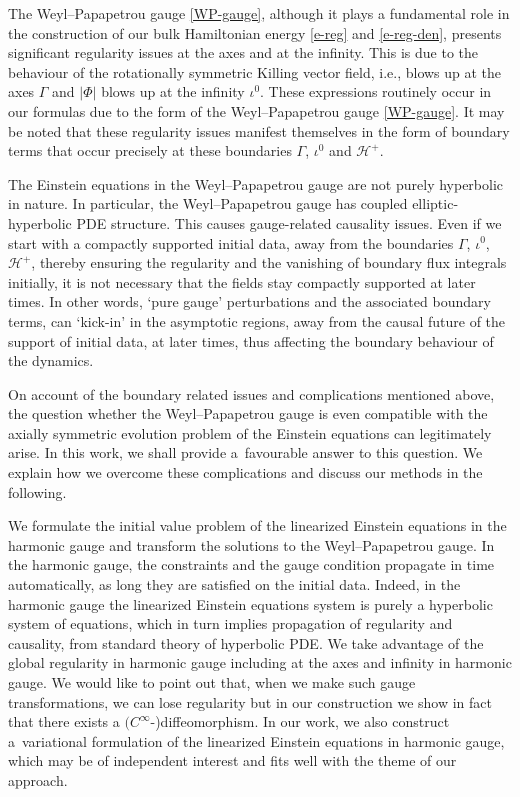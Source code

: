 \documentclass[pdftex]{sigma}
\numberwithin{equation}{section}
\begin{document}
The Weyl--Papapetrou gauge \eqref{WP-gauge}, although it plays a fundamental role in the construction of our bulk Hamiltonian energy \eqref{e-reg} and \eqref{e-reg-den}, presents significant regularity issues at the axes and at the infinity. This is due to the behaviour of the rotationally symmetric Killing vector field, i.e.,  blows up at the axes $\Gamma$ and $\vert \Phi \vert$ blows up at the infinity $\iota^0$. These expressions routinely occur in our formulas due to the form of the Weyl--Papapetrou gauge \eqref{WP-gauge}. It may be noted that these regularity issues manifest themselves in the form of boundary terms that occur precisely at these boundaries $\Gamma$, $\iota^0$ and $\mathcal{H}^+$.

The Einstein equations in the Weyl--Papapetrou gauge are not purely hyperbolic in nature. In particular, the Weyl--Papapetrou gauge has coupled elliptic-hyperbolic PDE structure. This causes gauge-related causality issues. Even if we start with a compactly supported initial data, away from the boundaries $\Gamma$, $\iota^0$, $\mathcal{H}^+$, thereby ensuring the regularity and the vanishing of boundary flux integrals initially, it is not necessary that the fields stay compactly supported at later times. In other words, `pure gauge' perturbations and the associated boundary terms, can `kick-in' in the asymptotic regions, away from the causal future of the support of initial data, at later times, thus affecting the boundary behaviour of the dynamics.



On account of the boundary related issues and complications mentioned above, the question whether the Weyl--Papapetrou gauge is even compatible with the axially symmetric evolution problem of the Einstein equations can legitimately arise. In this work, we shall provide a~favourable answer to this question. We explain how we overcome these complications and discuss our methods in the following.

We formulate the initial value problem of the linearized Einstein equations in the harmonic gauge and transform the solutions to the Weyl--Papapetrou gauge. In the harmonic gauge, the constraints and the gauge condition propagate in time automatically, as long they are satisfied on the initial data. Indeed, in the harmonic gauge the linearized Einstein equations system is purely a hyperbolic system of equations, which in turn implies propagation of regularity and causality, from standard theory of hyperbolic PDE. We take advantage of the global regularity in harmonic gauge including at the axes and infinity in harmonic gauge. We would like to point out that, when we make such gauge transformations, we can lose regularity but in our construction we show in fact that there exists a $(C^\infty$-)diffeomorphism.
 In our work, we also construct a~variational formulation of the linearized Einstein equations in harmonic gauge, which may be of independent interest and fits well with the theme of our approach.
\end{document}

